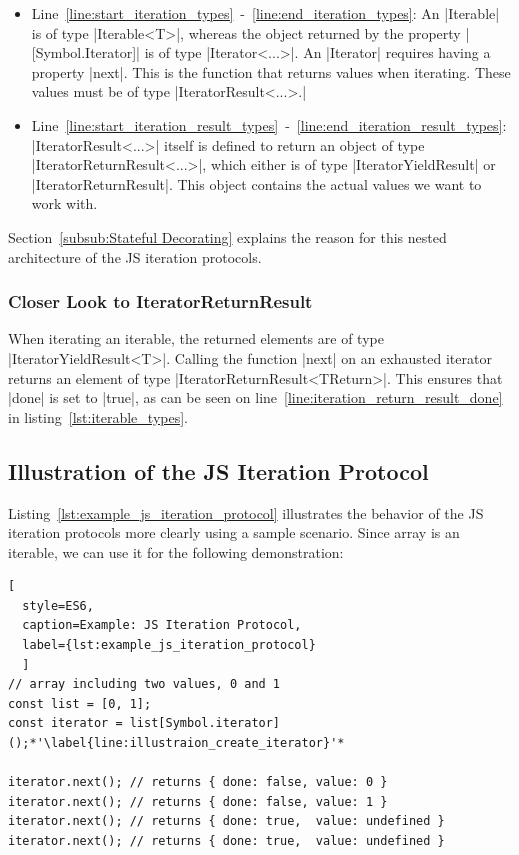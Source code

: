 \begin{itemize}
  \item{Line~\ref{line:start_iteration_types}~-~\ref{line:end_iteration_types}: 
      An |Iterable| is of type |Iterable<T>|, whereas the object returned by the property
      |[Symbol.Iterator]| is of type |Iterator<...>|. An |Iterator| requires having a property |next|. 
      This is the function that returns values when iterating. These values must be 
      of type |IteratorResult<...>.|
    }
  \item{Line~\ref{line:start_iteration_result_types}~-~\ref{line:end_iteration_result_types}:
      |IteratorResult<...>| itself is defined to return an 
      object of type |IteratorReturnResult<...>|, which either is of type
      |IteratorYieldResult| or |IteratorReturnResult|. This object contains the actual 
      values we want to work with.}
\end{itemize}

Section~\ref{subsub:Stateful Decorating} explains the reason for this nested
architecture of the JS iteration protocols.

\subsubsection{Closer Look to IteratorReturnResult}
\label{subsub:Closer look to IteratorReturnResult}
When iterating an iterable, the returned elements are of type
|IteratorYieldResult<T>|. Calling the function |next| on an exhausted iterator
returns an element of type |IteratorReturnResult<TReturn>|. This ensures that
|done| is set to |true|, as can be seen on
line~\ref{line:iteration_return_result_done} in
listing~\ref{lst:iterable_types}.

\subsection{Illustration of the JS Iteration Protocol}
\label{sub:Illustration of the JS Iteration Protocol}
Listing~\ref{lst:example_js_iteration_protocol} illustrates the behavior of the
JS iteration protocols more clearly using a sample scenario. Since array is an
iterable, we can use it for the following demonstration:

\begin{lstlisting}[
  style=ES6, 
  caption=Example: JS Iteration Protocol,
  label={lst:example_js_iteration_protocol}
  ]
// array including two values, 0 and 1
const list = [0, 1];
const iterator = list[Symbol.iterator]();*'\label{line:illustraion_create_iterator}'*

iterator.next(); // returns { done: false, value: 0 }
iterator.next(); // returns { done: false, value: 1 }
iterator.next(); // returns { done: true,  value: undefined }
iterator.next(); // returns { done: true,  value: undefined }
\end{lstlisting}


